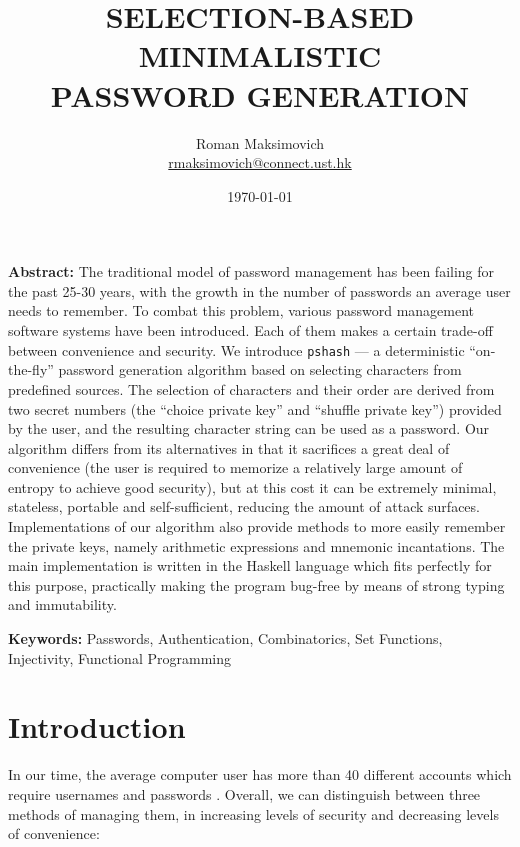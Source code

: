 \documentclass[a4paper, 10pt]{article}
\title{SELECTION-BASED MINIMALISTIC\\ PASSWORD GENERATION}
\author{
  Roman Maksimovich\\
  \href{mailto:rmaksimovich@connect.ust.hk}{rmaksimovich@connect.ust.hk}
}
\date{\today}
\theoremstyle{plain}
\theoremstyle{definition}
\begin{document}
\maketitle

\textbf{Abstract:}
The traditional model of password management has been failing for the past 25-30 years, with the growth in the number of passwords an average user needs to remember.
To combat this problem, various password management software systems have been introduced. Each of them makes a certain trade-off between convenience and security. We introduce \texttt{pshash} --- a
deterministic ``on-the-fly'' password generation algorithm based on
selecting characters from predefined sources. The selection of
characters and their order are derived from two secret numbers (the
``choice private key'' and ``shuffle private key'') provided by the
user, and the resulting character string can be used as a password.
Our algorithm differs from its alternatives in that it sacrifices a
great deal of convenience (the user is required to memorize a
relatively large amount of entropy to achieve good security), but at
this cost it can be extremely minimal, stateless, portable and self-sufficient, reducing the amount of attack surfaces. Implementations of our algorithm also provide methods to more easily remember the private keys, namely arithmetic expressions and mnemonic incantations. The main implementation is written in the Haskell language which fits perfectly for this purpose, practically making the program bug-free by means of strong typing and immutability.

\textbf{Keywords:}
Passwords, Authentication, Combinatorics, Set Functions, Injectivity, Functional Programming

\section{Introduction} \label{intro}

In our time, the average computer user has more than 40 different accounts which require usernames and passwords \cite{mirkovic}. Overall, we can distinguish between three methods of managing them, in increasing levels of security and decreasing levels of convenience:
\end{document}
